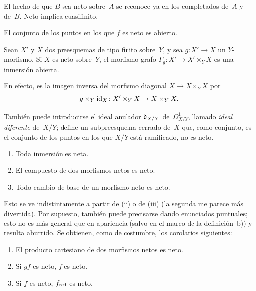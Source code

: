 \begin{remarquesstar}
El hecho
de que $B$ sea neto sobre~$A$ se reconoce ya en los completados de~$A$ y de~$B$. Neto implica cuasifinito.
\end{remarquesstar}

\begin{corollaire}
\label{I.3.3}
El conjunto de los puntos en los que $f$ es neto es abierto.
\end{corollaire}

\begin{corollaire}
\label{I.3.4}
Sean $X'$ y $X$ dos preesquemas de tipo finito sobre~$Y$, y sea $g\colon X'\to X$ un $Y$-morfismo. Si $X$ es neto sobre~$Y$, el morfismo grafo $\Gamma_g\colon X'\to X'\times_Y X$ es una inmersión abierta.%
\end{corollaire}

En efecto, es la imagen inversa del morfismo diagonal $X\to X\times_Y X$ por
$$
g\times_Y\mathrm{id}_X\colon X'\times_Y X\to X\times_Y X.
$$

También puede introducirse el ideal anulador $\mathfrak{d}_{X/Y}$
\label{indnot:af}%
de~$\mathit{\Omega}^1_{X/Y}$, llamado \emph{ideal diferente}
%
%
de~$X/Y$; define un subpreesquema cerrado de~$X$ que, como conjunto, es el conjunto de los puntos en los que $X/Y$ está ramificado, \ie no es neto.

\begin{proposition}
\label{I.3.5}
\begin{enumerate}
\item[(i)] Toda inmersión es neta.
\item[(ii)] El compuesto de dos morfismos netos es neto.
\item[(iii)] Todo cambio de base de un morfismo neto es neto.
\end{enumerate}
\end{proposition}

Esto se ve indistintamente a partir de (ii) o de (iii) (la segunda me parece más divertida). Por supuesto, también puede precisarse dando enunciados puntuales; esto no es más general que en apariencia (salvo en el marco de la definición~b)) y resulta aburrido. Se obtienen, como de costumbre, los corolarios siguientes:

\begin{corollaries}
\label{I.3.6}
\begin{enumerate}
\item[(iv)] El producto cartesiano de dos morfismos netos es neto.
\item[(v)] Si $gf$ es neto, $f$ es neto.
\item[(vi)] Si $f$ es neto, $f_{\text{\textup{red}}}$ es neto.
\end{enumerate}
\end{corollaries}

